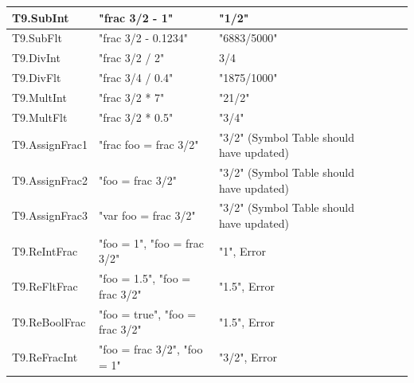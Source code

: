 \documentclass[a4paper, oneside, 11pt]{report}
\begin{document}
\begin{tabular}{|p{1.5in}|p{1.5in}|p{1.6in}|p{1.6in}|p{2.4in}|}
        \hline
        T9.SubInt      & "frac 3/2 - 1"                                 & "1/2"                                    &                                        \\
        \hline
        T9.SubFlt      & "frac 3/2 - 0.1234"                       & "6883/5000"                  &                                        \\
        \hline
        T9.DivInt      & "frac 3/2 / 2"                                 & 3/4                                      &                                        \\
        \hline
        T9.DivFlt      & "frac 3/4 / 0.4"                           & "1875/1000"           &                                        \\
        \hline
        T9.MultInt     & "frac 3/2 * 7"                                 & "21/2"                                   &                                        \\
        \hline
        T9.MultFlt     & "frac 3/2 * 0.5"                           & "3/4"                          &                                        \\
        \hline
        T9.AssignFrac1 & "frac foo = frac 3/2"                          & "3/2" (Symbol Table should have updated) &                                        \\
        \hline
        T9.AssignFrac2 & "foo = frac 3/2"                               & "3/2" (Symbol Table should have updated) &                                        \\
        \hline
        T9.AssignFrac3 & "var foo = frac 3/2"                           & "3/2" (Symbol Table should have updated) &                                        \\
        \hline
        T9.ReIntFrac   & "foo = 1", "foo = frac 3/2"                      & "1", Error                                 &                                        \\
        \hline
        T9.ReFltFrac   & "foo = 1.5", "foo = frac 3/2"                    & "1.5", Error                               &                                        \\
        \hline
        T9.ReBoolFrac   & "foo = true", "foo = frac 3/2"                    & "1.5", Error                               &                                        \\
        \hline
        T9.ReFracInt   & "foo = frac 3/2", "foo = 1"                      & "3/2", Error                                 &                                        \\

\end{tabular}
\end{document}
